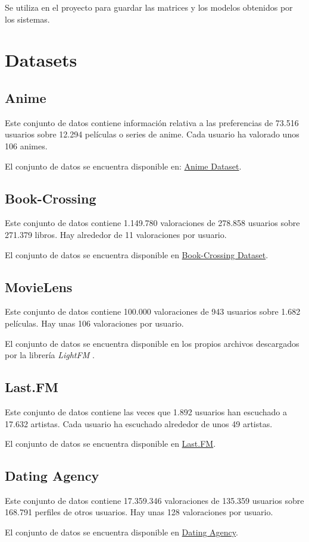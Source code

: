 Se utiliza en el proyecto para guardar las matrices y los modelos obtenidos por los sistemas.

\section{Datasets}\label{datasets}
\subsection{Anime}\label{anime}
Este conjunto de datos \cite{CopperUnion2017} contiene información relativa a las preferencias de 73.516 usuarios sobre 12.294 películas o series de anime. Cada usuario ha valorado unos 106 animes.

El conjunto de datos se encuentra disponible en: \href{https://www.kaggle.com/CooperUnion/anime-recommendations-database/downloads/anime-recommendations-database.zip/1}{Anime Dataset}.

\subsection{Book-Crossing}\label{book-crossing}
Este conjunto de datos \cite{Ziegler2004} contiene 1.149.780 valoraciones de 278.858 usuarios sobre 271.379 libros. Hay alrededor de 11 valoraciones por usuario.

El conjunto de datos se encuentra disponible en \href{http://www2.informatik.uni-freiburg.de/~cziegler/BX/BX-CSV-Dump.zip}{Book-Crossing Dataset}.

\subsection{MovieLens}\label{movielens}
Este conjunto de datos \cite{GroupLens1998} contiene 100.000 valoraciones de 943 usuarios sobre 1.682 películas. Hay unas 106 valoraciones por usuario.

El conjunto de datos se encuentra disponible en los propios archivos descargados por la librería \textit{LightFM} \cite{DBLP:conf/recsys/Kula15}.

\subsection{Last.FM}\label{last.fm}
Este conjunto de datos \cite{Cantador:RecSys2011} contiene las veces que 1.892 usuarios han escuchado a 17.632 artistas. Cada usuario ha escuchado alrededor de unos 49 artistas.

El conjunto de datos se encuentra disponible en \href{http://files.grouplens.org/datasets/hetrec2011/hetrec2011-lastfm-2k.zip}{Last.FM}.

\subsection{Dating Agency}\label{dating-agency}
Este conjunto de datos \cite{brozovsky07recommender} contiene 17.359.346 valoraciones de 135.359 usuarios sobre 168.791 perfiles de otros usuarios. Hay unas 128 valoraciones por usuario.

El conjunto de datos se encuentra disponible en \href{http://www.occamslab.com/petricek/data/libimseti-complete.zip}{Dating Agency}.